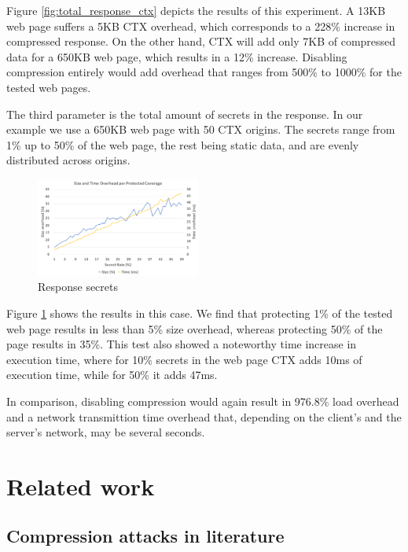 \documentclass[conference, letterpaper, 10pt]{IEEEtran}
\begin{document}
Figure \ref{fig:total_response_ctx} depicts the results of this experiment. A 13KB web page suffers a 5KB
CTX overhead, which corresponds to a 228\% increase in compressed response. On the
other hand, CTX will add only 7KB of compressed data for a 650KB web page, which
results in a 12\% increase. Disabling compression entirely would add overhead
that ranges from 500\% to 1000\% for the tested web pages.

The third parameter is the total amount of secrets in the response. In our
example we use a 650KB web page with 50 CTX origins. The secrets range from 1\%
up to 50\% of the web page, the rest being static data, and are evenly
distributed across origins.

    \begin{figure}[thpb]
        \centering
            \includegraphics[width=0.48\textwidth]{experiments/response_secrets.png}
        \caption{Response secrets}
        \label{fig:response_secrets_ctx}
    \end{figure}

Figure \ref{fig:response_secrets_ctx} shows the results in this case. We find that protecting 1\% of the
tested web page results in less than 5\% size overhead, whereas protecting 50\% of
the page results in 35\%. This test also showed a noteworthy time increase in
execution time, where for 10\% secrets in the web page CTX adds 10ms of
execution time, while for 50\% it adds 47ms.

In comparison, disabling compression would again result in 976.8\% load overhead
and a network transmittion time overhead that, depending on the client's and the
server's network, may be several seconds.

\section{Related work}\label{sec:related}

\subsection{Compression attacks in literature}
\end{document}
